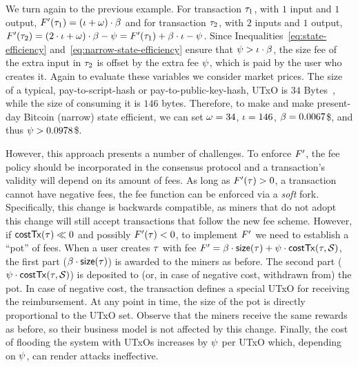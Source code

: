 We turn again to the previous example. For transaction $\tau_1$, with $1$ input
and $1$ output, $F'(\tau_1) = (\iota + \omega) \cdot
\beta$ and for transaction $\tau_2$, with $2$ inputs and $1$ output,
$F'(\tau_2) = (2 \cdot \iota + \omega) \cdot \beta -
\psi = F'(\tau_1) + \beta \cdot \iota - \psi$.
Since Inequalities~\ref{eq:state-efficiency}
and~\ref{eq:narrow-state-efficiency} ensure that $\psi > \iota \cdot
\beta$, the size fee of the extra input in $\tau_2$ is offset by the
extra fee $\psi$, which is paid by the user who creates it.
Again to evaluate these variables we consider market prices. The size of a
typical, pay-to-script-hash or pay-to-public-key-hash, UTxO is
$34$ Bytes~\cite{btc-tx}, while the size of consuming it is $146$ bytes.
Therefore, to make and make present-day Bitcoin (narrow) state efficient, we can
set $\omega = 34$, $\iota = 146$, $\beta = 0.0067$\$, and thus
$\psi > 0.0978$\$.

However, this approach presents a number of challenges. To enforce
$F'$, the fee policy should be incorporated in the consensus
protocol and a transaction's validity will depend on its amount of fees. As
long as $F'(\tau) > 0$, \ie a transaction cannot have negative fees,
the fee function can be enforced via a \emph{soft} fork. Specifically, this
change is backwards compatible, as miners that do not adopt this change will
still accept transactions that follow the new fee scheme. However, if
$\mathsf{costTx}(\tau) \ll 0$ and possibly $F'(\tau) < 0$, to implement
$F'$ we need to establish a ``pot'' of fees. When a user creates
$\tau$ with fee $F' = \beta \cdot \mathsf{size}(\tau) +
\psi \cdot \mathsf{costTx}(\tau, \mathcal{S})$, the first part ($\beta
\cdot \mathsf{size}(\tau)$) is awarded to the miners as before. The second part
($\psi \cdot \mathsf{costTx}(\tau, \mathcal{S})$) is deposited to (or, in case of
negative cost, withdrawn from) the pot. In case of negative cost, the
transaction defines a special UTxO for receiving the reimbursement. At any
point in time, the size of the pot is directly proportional to the UTxO set.
Observe that the miners receive the same rewards as before, so their business
model is not affected by this change. Finally, the cost of flooding the system
with UTxOs increases by $\psi$ per UTxO which, depending on $\psi$, can
render attacks ineffective.
